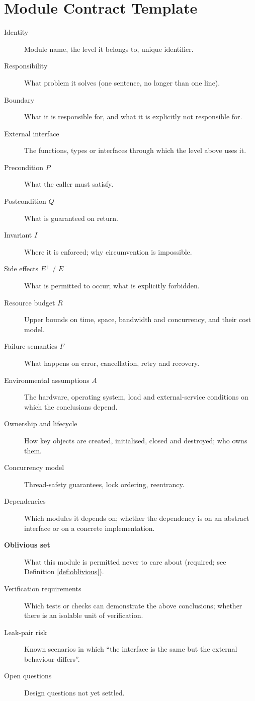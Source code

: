 \section{Module Contract Template}

\begin{description}
\item[Identity] Module name, the level it belongs to, unique identifier.
\item[Responsibility] What problem it solves (one sentence, no longer than one line).
\item[Boundary] What it is responsible for, and what it is explicitly not responsible for.
\item[External interface] The functions, types or interfaces through which the level above
      uses it.
\item[Precondition $P$] What the caller must satisfy.
\item[Postcondition $Q$] What is guaranteed on return.
\item[Invariant $I$] Where it is enforced; why circumvention is impossible.
\item[Side effects $E^{+}$ / $E^{-}$] What is permitted to occur; what is explicitly
      forbidden.
\item[Resource budget $R$] Upper bounds on time, space, bandwidth and concurrency, and their
      cost model.
\item[Failure semantics $F$] What happens on error, cancellation, retry and recovery.
\item[Environmental assumptions $A$] The hardware, operating system, load and external-service
      conditions on which the conclusions depend.
\item[Ownership and lifecycle] How key objects are created, initialised, closed and destroyed;
      who owns them.
\item[Concurrency model] Thread-safety guarantees, lock ordering, reentrancy.
\item[Dependencies] Which modules it depends on; whether the dependency is on an abstract
      interface or on a concrete implementation.
\item[\textbf{Oblivious set}] What this module is permitted never to care about (required; see
      Definition \ref{def:oblivious}).
\item[Verification requirements] Which tests or checks can demonstrate the above conclusions;
      whether there is an isolable unit of verification.
\item[Leak-pair risk] Known scenarios in which ``the interface is the same but the external
      behaviour differs''.
\item[Open questions] Design questions not yet settled.
\end{description}

